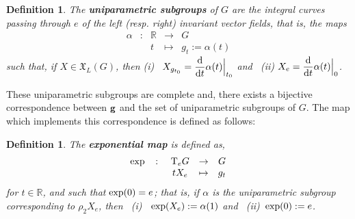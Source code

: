 \documentclass[12pt]{report}
\newtheorem{definition}[teor]{Definition}
\def\vf{\mathfrak X}
\def\d{{\rm d}}
\def\Real{\mathbb{R}}
\def\Tan{{\rm T}}
\begin{document}
\begin{appendix}
\begin{definition}
The \textbf{uniparametric subgroups} of $G$ 
are the integral curves passing through $e$
of the left (resp. right) invariant vector fields,
that is, the maps 
$$ 
\begin{array}{ccccc}
\alpha &\colon&\Real&\to&G
\\
& &t&\mapsto&g_t:=\alpha(t)
\end{array} 
$$
such that, if $X \in \vf_L(G)$, then
{\rm (i)} \ 
$\displaystyle X_{g_{t_0}} = \frac{\d}{\d t} \alpha (t)\Big\vert_{t_0}$ and \ 
{\rm (ii)}
$\displaystyle X_e = \frac{\d}{\d t} \alpha (t)\Big\vert_0$.
\end{definition}

These uniparametric subgroups are complete and,
there exists a bijective correspondence between
${\bf g}$ and the set of uniparametric subgroups of $G$.
The map which implements this correspondence is defined as follows:

\begin{definition}
The \textbf{exponential map}
is defined as,
$$ 
\begin{array}{ccccc}
{\rm exp}&\colon&\Tan_eG&\to&G
\\
& &tX_e&\mapsto&g_t
\end{array} 
$$
for $t \in \Real$, and such that
${\rm exp}(0)=e$; that is, if $\alpha$ is the uniparametric subgroup
corresponding to $\rho_2X_e$, then \ 
{\rm (i)} \ 
${\rm exp}(X_e) := \alpha(1)$ and \
{\rm (ii)}\ 
${\rm exp}(0) := e$.
\end{definition}


\end{appendix}
\end{document}
